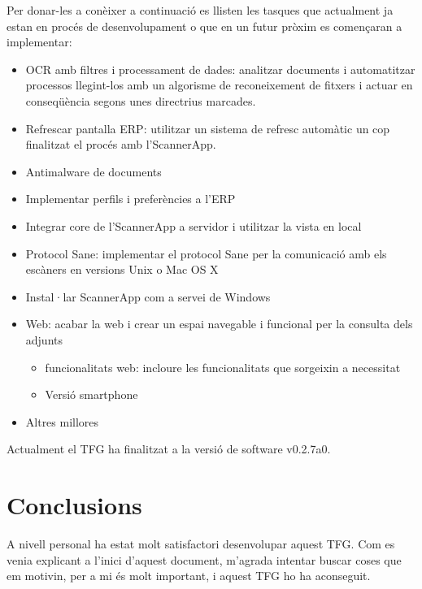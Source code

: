\documentclass[letterpaper,11pt,catalan]{sphinxmanual}
\begin{document}
Per donar-les a conèixer a continuació es llisten les tasques que actualment ja estan en procés de desenvolupament o que en un futur pròxim es començaran a implementar:
\begin{itemize}
\item {} 
OCR amb filtres i processament de dades: analitzar documents i automatitzar processos llegint-los amb un algorisme de reconeixement de fitxers i actuar en conseqüència segons unes directrius marcades.

\item {} 
Refrescar pantalla ERP: utilitzar un sistema de refresc automàtic un cop finalitzat el procés amb l'ScannerApp.

\item {} 
Antimalware de documents

\item {} 
Implementar perfils i preferències a l'ERP

\item {} 
Integrar core de l'ScannerApp a servidor i utilitzar la vista en local

\item {} 
Protocol Sane: implementar el protocol Sane per la comunicació amb els escàners en versions Unix o Mac OS X

\item {} 
Instal·lar ScannerApp com a servei de Windows

\item {} 
Web: acabar la web i crear un espai navegable i funcional per la consulta dels adjunts
\begin{itemize}
\item {} 
funcionalitats web: incloure les funcionalitats que sorgeixin a necessitat

\item {} 
Versió smartphone

\end{itemize}

\item {} 
Altres millores

\end{itemize}

Actualment el TFG ha finalitzat a la versió de software v0.2.7a0.


\chapter{Conclusions}
\label{\detokenize{index:conclusions}}
A nivell personal ha estat molt satisfactori desenvolupar aquest TFG. Com es venia explicant
a l'inici d'aquest document, m'agrada intentar buscar coses que em motivin, per a mi és molt
important, i aquest TFG ho ha aconseguit.
\end{document}

